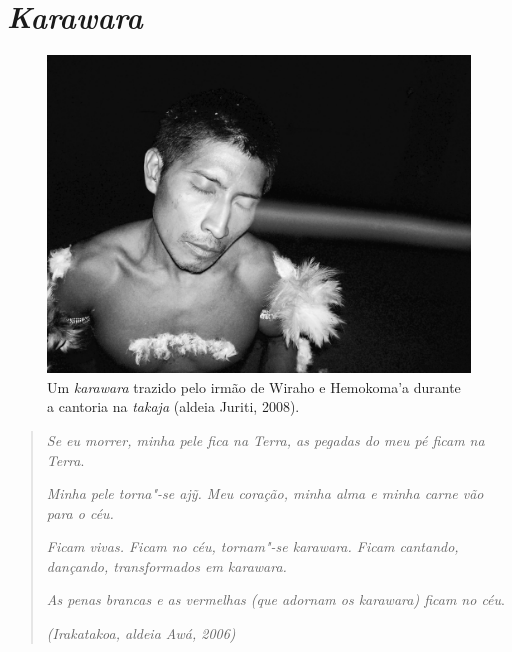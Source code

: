 
\chapter{\emph{Karawara}}\label{karawara}

\begin{figure}[H]
\centering
  \includegraphics[width=\textwidth]{./imgs/100_1752}
\caption{Um \emph{karawara} trazido pelo irmão de Wiraho e Hemokoma’a durante a cantoria na \emph{takaja} (aldeia Juriti, 2008).}
\end{figure}

\begin{quote}
\emph{Se eu morrer, minha pele fica na Terra, as pegadas do meu pé
ficam na Terra}.

\noindent
\emph{Minha pele torna"-se ajỹ. Meu coração, minha alma e minha carne vão
para o céu.}

\noindent
\emph{Ficam vivas. Ficam no céu, tornam"-se karawara. Ficam cantando,
dançando, transformados em karawara.}

\noindent
\emph{As penas brancas e as vermelhas (que adornam os karawara) ficam no
céu}.

\begin{flushright}
\emph{(Irakatakoa, aldeia Awá, 2006)}\footnotemark
\end{flushright}

\end{quote}

